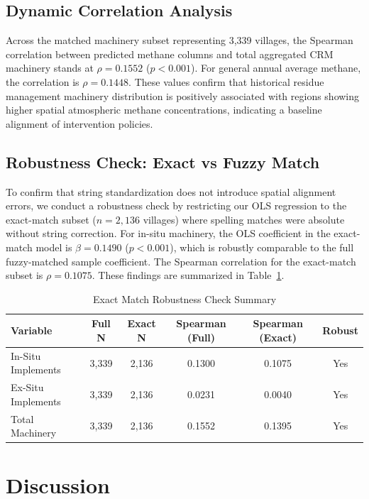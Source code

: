 \documentclass[12pt,a4paper]{report}
\begin{document}
\subsection{Dynamic Correlation Analysis}
Across the matched machinery subset representing 3,339 villages, the Spearman correlation between predicted methane columns and total aggregated CRM machinery stands at $\rho = 0.1552$ ($p < 0.001$). For general annual average methane, the correlation is $\rho = 0.1448$. These values confirm that historical residue management machinery distribution is positively associated with regions showing higher spatial atmospheric methane concentrations, indicating a baseline alignment of intervention policies.

\subsection{Robustness Check: Exact vs Fuzzy Match}
To confirm that string standardization does not introduce spatial alignment errors, we conduct a robustness check by restricting our OLS regression to the exact-match subset ($n=2,136$ villages) where spelling matches were absolute without string correction. For in-situ machinery, the OLS coefficient in the exact-match model is $\beta = 0.1490$ ($p < 0.001$), which is robustly comparable to the full fuzzy-matched sample coefficient. The Spearman correlation for the exact-match subset is $\rho = 0.1075$. These findings are summarized in Table~\ref{tab:robustness_check_detailed}.

\begin{table}[H]
\centering
\caption{Exact Match Robustness Check Summary}
\label{tab:robustness_check_detailed}
\begin{tabular}{lccccc}
\toprule
\textbf{Variable} & \textbf{Full N} & \textbf{Exact N} & \textbf{Spearman (Full)} & \textbf{Spearman (Exact)} & \textbf{Robust} \\
\midrule
In-Situ Implements & 3,339 & 2,136 & 0.1300 & 0.1075 & Yes \\
Ex-Situ Implements & 3,339 & 2,136 & 0.0231 & 0.0040 & Yes \\
Total Machinery & 3,339 & 2,136 & 0.1552 & 0.1395 & Yes \\
\bottomrule
\end{tabular}
\end{table}

\section{Discussion}
\end{document}
